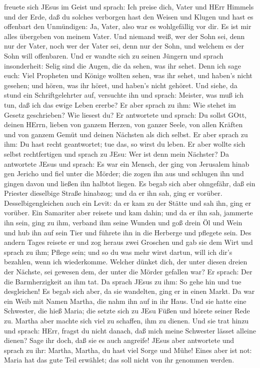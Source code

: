freuete sich JEsus im Geist und sprach: Ich preise dich, Vater und HErr
Himmels und der Erde, daß du solches verborgen hast den Weisen und
Klugen und hast es offenbart den Unmündigen: Ja, Vater, also war es
wohlgefällig vor dir.  Es ist mir alles übergeben von
meinem Vater. Und niemand weiß, wer der Sohn sei, denn nur der Vater,
noch wer der Vater sei, denn nur der Sohn, und welchem es der Sohn will
offenbaren.  Und er wandte sich zu seinen Jüngern und
sprach insonderheit: Selig sind die Augen, die da sehen, was ihr sehet.
 Denn ich sage euch: Viel Propheten und Könige wollten
sehen, was ihr sehet, und haben's nicht gesehen; und hören, was ihr
höret, und haben's nicht gehöret.  Und siehe, da stund ein
Schriftgelehrter auf, versuchte ihn und sprach: Meister, was muß ich
tun, daß ich das ewige Leben ererbe?  Er aber sprach zu
ihm: Wie stehet im Gesetz geschrieben? Wie liesest du?  Er
antwortete und sprach: Du sollst GOtt, deinen HErrn, lieben von ganzem
Herzen, von ganzer Seele, von allen Kräften und von ganzem Gemüt und
deinen Nächsten als dich selbst.  Er aber sprach zu ihm: Du
hast recht geantwortet; tue das, so wirst du leben.  Er
aber wollte sich selbst rechtfertigen und sprach zu JEsu: Wer ist denn
mein Nächster?  Da antwortete JEsus und sprach: Es war ein
Mensch, der ging von Jerusalem hinab gen Jericho und fiel unter die
Mörder; die zogen ihn aus und schlugen ihn und gingen davon und ließen
ihn halbtot liegen.  Es begab sich aber ohngefähr, daß ein
Priester dieselbige Straße hinabzog; und da er ihn sah, ging er vorüber.
 Desselbigengleichen auch ein Levit: da er kam zu der
Stätte und sah ihn, ging er vorüber.  Ein Samariter aber
reisete und kam dahin; und da er ihn sah, jammerte ihn sein,
 ging zu ihm, verband ihm seine Wunden und goß drein Öl und
Wein und hub ihn auf sein Tier und führete ihn in die Herberge und
pflegete sein.  Des andern Tages reisete er und zog heraus
zwei Groschen und gab sie dem Wirt und sprach zu ihm; Pflege sein; und
so du was mehr wirst dartun, will ich dir's bezahlen, wenn ich
wiederkomme.  Welcher dünket dich, der unter diesen dreien
der Nächste, sei gewesen dem, der unter die Mörder gefallen war?
 Er sprach: Der die Barmherzigkeit an ihm tat. Da sprach
JEsus zu ihm: So gehe hin und tue desgleichen!  Es begab
sich aber, da sie wandelten, ging er in einen Markt. Da war ein Weib mit
Namen Martha, die nahm ihn auf in ihr Haus.  Und sie hatte
eine Schwester, die hieß Maria; die setzte sich zu JEsu Füßen und hörete
seiner Rede zu.  Martha aber machte sich viel zu schaffen,
ihm zu dienen. Und sie trat hinzu und sprach: HErr, fragst du nicht
danach, daß mich meine Schwester lässet alleine dienen? Sage ihr doch,
daß sie es auch angreife!  JEsus aber antwortete und sprach
zu ihr: Martha, Martha, du hast viel Sorge und Mühe!  Eines
aber ist not: Maria hat das gute Teil erwählet; das soll nicht von ihr
genommen werden.

